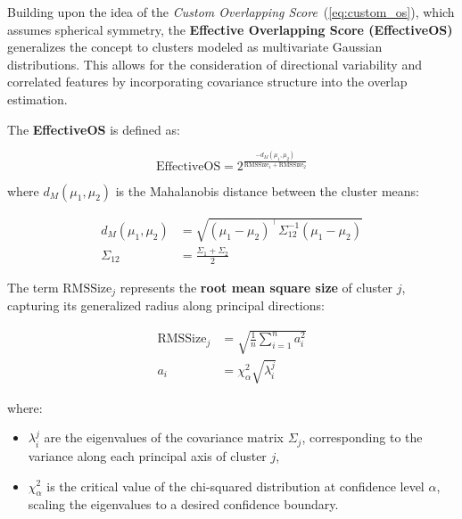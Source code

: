 Building upon the idea of the \textit{Custom Overlapping
      Score}~(\ref{eq:custom_os}), which assumes spherical symmetry, the
\textbf{Effective Overlapping Score (EffectiveOS)} generalizes the concept to
clusters modeled as multivariate Gaussian distributions. This allows for the
consideration of directional variability and correlated features by
incorporating covariance structure into the overlap estimation.

The \textbf{EffectiveOS} is defined as:

\begin{equation}
      \text{EffectiveOS} = 2^{\frac{-d_M(\mu_1, \mu_2)}{\text{RMSSize}_1 + \text{RMSSize}_2}}
\end{equation}

where $ d_M(\mu_1, \mu_2) $ is the Mahalanobis distance between the cluster
means:

\begin{align}
      d_M(\mu_1, \mu_2) & = \sqrt{(\mu_1 - \mu_2)^\top \Sigma_{12}^{-1} (\mu_1 - \mu_2)} \\
      \Sigma_{12}       & = \frac{\Sigma_1 + \Sigma_2}{2}
\end{align}

The term $ \text{RMSSize}_j $ represents the \textbf{root mean square size} of
cluster $ j $, capturing its generalized radius along principal directions:

\begin{align}
      \text{RMSSize}_j & = \sqrt{\frac{1}{n} \sum_{i=1}^n a_i^2} \\
      a_i              & = \chi^2_\alpha \sqrt{\lambda_i^j}
\end{align}

where:
\begin{itemize}
      \item $ \lambda_i^j $ are the eigenvalues of the covariance matrix $ \Sigma_j $,
            corresponding to the variance along each principal axis of cluster $ j $,
      \item $ \chi^2_\alpha $ is the critical value of the chi-squared distribution at
            confidence level $ \alpha $, scaling the eigenvalues to a desired confidence boundary.
\end{itemize}

